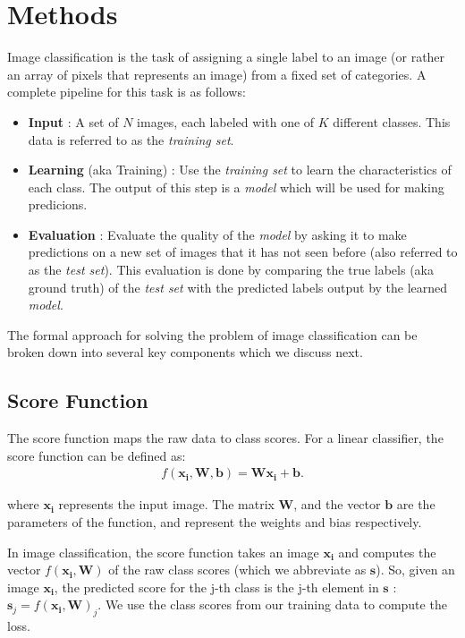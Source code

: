 \section{Methods}
\label{sec:methods}

Image classification is the task of assigning a single label to an image (or rather an array of pixels that represents an image) from a fixed set of categories. A complete pipeline for this task is as follows:
\begin{itemize}[noitemsep]
\item \textbf{Input} : A set of $N$ images, each labeled with one of $K$ different classes. This data is referred to as the \textit{training set}.
\item \textbf{Learning} (aka Training) : Use the \textit{training set} to learn the characteristics of each class. The output of this step is a \textit{model} which will be used for making predicions.
\item \textbf{Evaluation}  : Evaluate the quality of the \textit{model} by asking it to make predictions on a new set of images that it has not seen before (also referred to as the \textit{test set}). This evaluation is done by comparing the true labels (aka ground truth) of the \textit{test set} with the predicted labels output by the learned \textit{model}.
\end{itemize}

The formal approach for solving the problem of image classification can be broken down into several key components which we discuss next.

\subsection{Score Function}
\label{subsec:scorefunction}

The score function maps the raw data to class scores. For a linear classifier, the score function can be defined as: 
\begin{align}
f(\boldsymbol{x_{i}}, \boldsymbol{W}, \boldsymbol{b}) = \boldsymbol{W} \boldsymbol{x_{i}} + \boldsymbol{b}.\label{eqn:scorefunction}
\end{align}

where $\boldsymbol{x_{i}}$ represents the input image. The matrix $\boldsymbol{W}$, and the vector $\boldsymbol{b}$ are the parameters of the function, and represent the weights and bias respectively.

In image classification, the score function takes an image ${\boldsymbol {x_{i}}}$ and computes the vector $f(\boldsymbol{x_{i}}, \boldsymbol{W})$ of the raw class scores (which we abbreviate as ${\boldsymbol {s}}$). So, given an image ${\boldsymbol {x_{i}}}$, the predicted score for the j-th class is the j-th element in $\boldsymbol{s}$ : $\boldsymbol{s}_{j} = f(\boldsymbol{x_{i}}, \boldsymbol{W})_{j}$. We use the  class scores from our training data to compute the loss.

